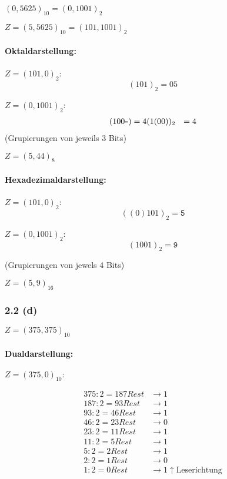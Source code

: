 \documentclass[11pt,a4paper]{article}
\begin{document}
$(0,5625)_{10} =(0,1001)_2$


$Z = (5,5625)_{10} = (101,1001)_2$

\paragraph{Oktaldarstellung:}
$Z = (101,0)_2$:
\begin{equation*}
(101)_2 = 05
\end{equation*}

$Z = (0,1001)_2$:
\begin{align*}
(100_") &= 4
(1(00))_2 &= 4
\end{align*}
(Grupierungen von jeweils 3 Bits)

$Z = (5,44)_8$

\paragraph{Hexadezimaldarstellung:}
$Z = (101,0)_2$:
\begin{equation*}
((0)101)_2 = \mathtt{5}
\end{equation*}

$Z = (0,1001)_2$:
\begin{equation*}
(1001)_2 = \mathtt{9}
\end{equation*}

(Grupierungen von jewels 4 Bits)

$Z =(5,9)_{16}$

\subsubsection{2.2 (d)}
$Z = (375,375)_{10}$

\paragraph{Dualdarstellung:}
$Z = (375,0)_{10}:$

\begin{align*}
375 : 2 = 187 Rest &\rightarrow 1\\
187 : 2 = 93 Rest &\rightarrow 1\\
93 : 2 = 46 Rest &\rightarrow 1\\
46 : 2 = 23 Rest &\rightarrow 0\\
23 : 2 = 11 Rest &\rightarrow 1\\
11 : 2 = 5 Rest &\rightarrow 1\\
5 : 2 = 2 Rest &\rightarrow 1\\
2: 2 = 1  Rest &\rightarrow 0\\
1 : 2 = 0 Rest &\rightarrow 1 \uparrow \mbox{Leserichtung}
\end{align*}
\end{document}
